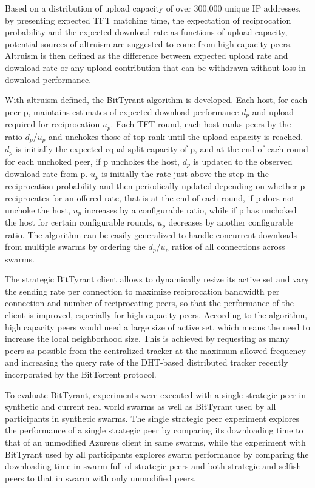 \documentclass[conference]{IEEEtran}
\begin{document}
Based on a distribution of upload capacity of over 300,000 unique IP addresses, by presenting expected TFT matching time, the expectation of reciprocation probability and the expected download rate as functions of upload capacity, potential sources of altruism are suggested to come from high capacity peers. Altruism is then defined as the difference between expected upload rate and download rate or any upload contribution that can be withdrawn without loss in download performance.

With altruism defined, the BitTyrant algorithm is developed. Each host, for each peer p, maintains estimates of expected download performance $d_p$ and upload required for reciprocation $u_p$. Each TFT round, each host ranks peers by the ratio $d_p$/$u_p$ and unchokes those of top rank until the upload capacity is reached. $d_p$ is initially the expected equal split capacity of p, and at the end of each round for each unchoked peer, if p unchokes the host, $d_p$ is updated to the observed download rate from p. $u_p$ is initially the rate just above the step in the reciprocation probability and then periodically updated depending on whether p reciprocates for an offered rate, that is at the end of each round, if p does not unchoke the host, $u_p$ increases by a configurable ratio, while if p has unchoked the host for certain configurable rounds, $u_p$ decreases by another configurable ratio. The algorithm can be easily generalized to handle concurrent downloads from multiple swarms by ordering the $d_p$/$u_p$ ratios of all connections across swarms.

The strategic BitTyrant client allows to dynamically resize its active set and vary the sending rate per connection to maximize reciprocation bandwidth per connection and number of reciprocating peers, so that the performance of the client is improved, especially for high capacity peers. According to the algorithm, high capacity peers would need a large size of active set, which means the need to increase the local neighborhood size. This is achieved by requesting as many peers as possible from the centralized tracker at the maximum allowed frequency and increasing the query rate of the DHT-based distributed tracker recently incorporated by the BitTorrent protocol.

To evaluate BitTyrant, experiments were executed with a single strategic peer in synthetic and current real world swarms as well as BitTyrant used by all participants in synthetic swarms. The single strategic peer experiment explores the performance of a single strategic peer by comparing its downloading time to that of an unmodified Azureus client in same swarms, while the experiment with BitTyrant used by all participants explores swarm performance by comparing the downloading time in swarm full of strategic peers and both strategic and selfish peers to that in swarm with only unmodified peers.
\end{document}
